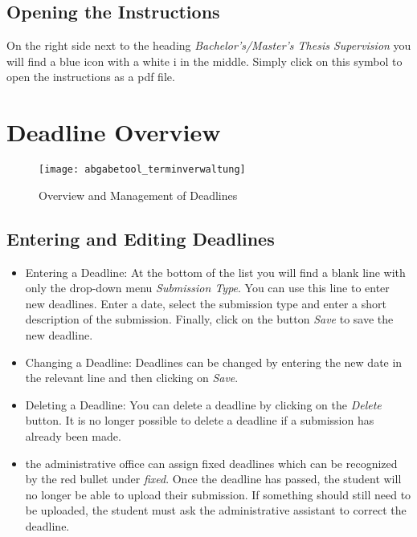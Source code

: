 \subsection{Opening the Instructions}
On the right side next to the heading \textit{Bachelor's/Master's Thesis Supervision} you will find a blue icon with a white i in the middle. Simply click on this symbol to open the instructions as a pdf file.

\section{Deadline Overview}

\begin {figure}
	\centering
	\texttt{[image: abgabetool\_terminverwaltung]}
	\caption{ Overview and Management of Deadlines}
	\label{abgabetool_terminverwaltung}
\end {figure}

\subsection{Entering and Editing Deadlines}

\begin{itemize}
	\item Entering a Deadline: At the bottom of the list you will find a blank line with only the drop-down menu \textit{Submission Type}. You can use this line to enter new deadlines. Enter a date, select the submission type and enter a short description of the submission. Finally, click on the button \textit{Save} to save the new deadline.
	\item Changing a Deadline: Deadlines can be changed by entering the new date in the relevant line and then clicking on \textit{Save}.
	\item Deleting a Deadline: You can delete a deadline by clicking on the \textit {Delete} button. It is no longer possible to delete a deadline if a submission has already been made.
	
	\item the administrative office can assign fixed deadlines which can be recognized by the red bullet under \textit{fixed}. Once the deadline has passed, the student will no longer be able to upload their submission. If something should still need to be uploaded, the student must ask the administrative assistant to correct the deadline.
	
\end{itemize}

